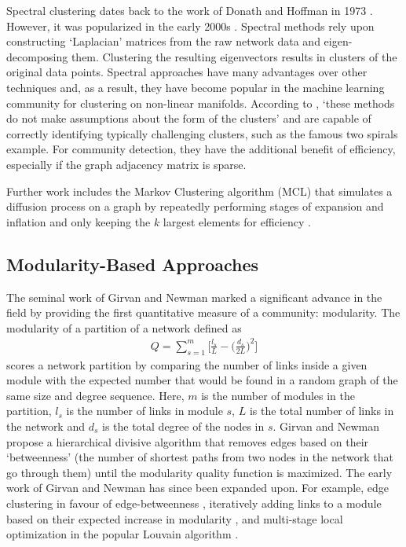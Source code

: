 \documentclass{report}
\begin{document}
	Spectral clustering dates back to the work of Donath and Hoffman in 1973 \cite{donath1973lower}. 
	However, it was popularized in the early 2000s \cite{shi2000normalized,ng2002spectral,ding2004tutorial}. 
	Spectral methods rely upon constructing `Laplacian' matrices from the raw network data and eigen-decomposing them. 
	Clustering the resulting eigenvectors results in clusters of the original data points. 
	Spectral approaches have many advantages over other techniques and, as a result, they have become popular in the machine learning community for clustering  on non-linear manifolds. 
	According to \cite{von2007tutorial}, `these methods do not make assumptions about the form of the clusters' and are capable of correctly identifying typically challenging clusters, such as the famous two spirals example. 
	For community detection, they have the additional benefit of efficiency, especially if the graph adjacency matrix is sparse. 

	Further work includes the Markov Clustering algorithm (MCL) that simulates a diffusion process on a graph by repeatedly performing stages of expansion and inflation and only keeping the $k$ largest elements for efficiency \cite{van2001graph}. 
	
	\subsection{Modularity-Based Approaches}
	The seminal work of Girvan and Newman \cite{girvan2002community} marked a significant advance in the field by providing the first quantitative measure of a community: modularity. 
	The modularity of a partition of a network 
	defined as
	\begin{align} 
	\label{modularity}
	Q = \sum_{s=1}^m \bigg[ \frac{l_s}{L} - \bigg( \frac{d_s}{2L} \bigg)^2\bigg]
	\end{align}
	scores a network partition by comparing the number of links inside a given module with the expected number that would be found in a random graph of the same size and degree sequence. 
	Here, $m$ is the number of modules in the partition, $l_s$ is the number of links in module $s$, $L$ is the total number of links in the network and $d_s$ is the total degree of the nodes in $s$. 
	Girvan and Newman propose a hierarchical divisive algorithm that removes edges based on their `betweenness' (the number of shortest paths from two nodes in the network that go through them) until the modularity quality function is maximized. 
	The early work of Girvan and Newman has since been expanded upon.
	For example, edge clustering in favour of edge-betweenness \cite{radicchi2004defining}, iteratively adding links to a module based on their expected increase in modularity \cite{clauset2004finding}, and multi-stage local optimization in the popular Louvain algorithm \cite{blondel2008fast}.
	
\end{document}
